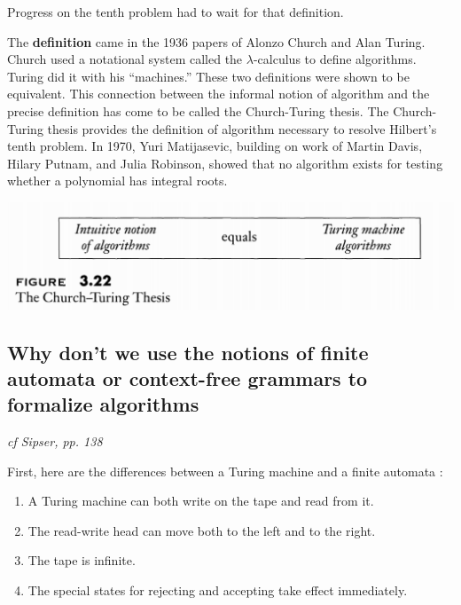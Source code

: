 \documentclass[main.tex]{subfiles}
\begin{document}
Progress on the tenth problem had to wait for that definition.
\par \par The \textbf{definition} came in the 1936 papers of Alonzo Church and Alan Turing. Church used a notational system called the $\lambda$-calculus to define algorithms.
Turing did it with his “machines.” These two definitions were shown to be
equivalent. This connection between the informal notion of algorithm and the
precise definition has come to be called the Church-Turing thesis.
The Church-Turing thesis provides the definition of algorithm necessary to
resolve Hilbert’s tenth problem. In 1970, Yuri Matijasevic, building on work of
Martin Davis, Hilary Putnam, and Julia Robinson, showed that no algorithm exists for testing whether a polynomial has integral roots. 
\begin{center}
    \includegraphics[scale=0.45]{images/figure322.png}
\end{center}
\subsection{Why don’t we use the notions of finite automata or context-free grammars to formalize algorithms} 
\emph{cf Sipser, pp. 138}
\par First, here are the differences between a Turing machine and a finite automata : 
\begin{enumerate}
    \item A Turing machine can both write on the tape and read from it.
    \item The read-write head can move both to the left and to the right.
    \item The tape is infinite.
    \item The special states for rejecting and accepting take effect immediately.
\end{enumerate}

\end{document}
